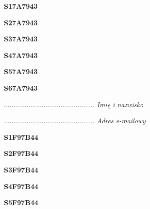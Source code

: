 \begin{turn}{90}\huge \textbf{S17A7943}\end{turn}

\begin{turn}{90}\huge \textbf{S27A7943}\end{turn}

\begin{turn}{90}\huge \textbf{S37A7943}\end{turn}

\begin{turn}{90}\huge \textbf{S47A7943}\end{turn}

\begin{turn}{90}\huge \textbf{S57A7943}\end{turn}

\begin{turn}{90}\huge \textbf{S67A7943}\end{turn}

\begin{turn}{90}\begin{minipage}{\linewidth} \vspace{20mm} ................................................  \textit{Imię i nazwisko}\end{minipage}\end{turn}

\begin{turn}{90}\begin{minipage}{\linewidth} \vspace{20mm} ................................................  \textit{Adres e-mailowy}\end{minipage}\end{turn}

\begin{turn}{90}\huge \textbf{S1F97B44}\end{turn}

\begin{turn}{90}\huge \textbf{S2F97B44}\end{turn}

\begin{turn}{90}\huge \textbf{S3F97B44}\end{turn}

\begin{turn}{90}\huge \textbf{S4F97B44}\end{turn}

\begin{turn}{90}\huge \textbf{S5F97B44}\end{turn}

